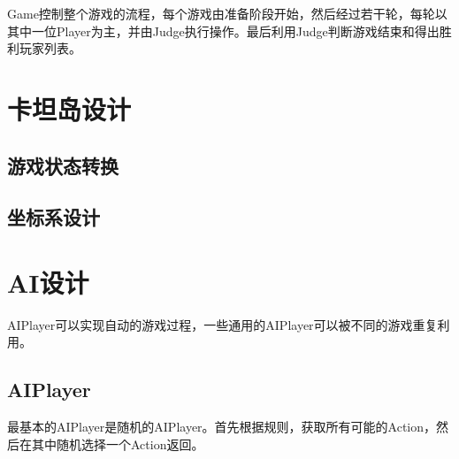 \documentclass[export, 12pt, letterpaper]{ctexrep}
\begin{document}
Game控制整个游戏的流程，每个游戏由准备阶段开始，然后经过若干轮，每轮以其中一位Player为主，并由Judge执行操作。最后利用Judge判断游戏结束和得出胜利玩家列表。

\chapter{卡坦岛设计}

\section{游戏状态转换}


\section{坐标系设计}

\chapter{AI设计}

AIPlayer可以实现自动的游戏过程，一些通用的AIPlayer可以被不同的游戏重复利用。


\section{AIPlayer}
最基本的AIPlayer是随机的AIPlayer。首先根据规则，获取所有可能的Action，然后在其中随机选择一个Action返回。
\end{document}
